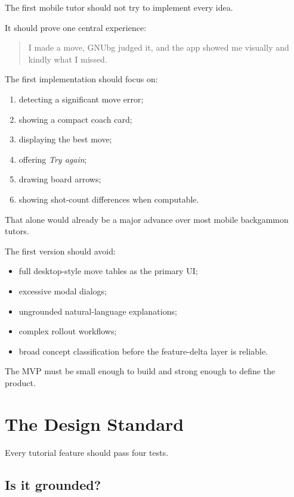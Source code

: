 \documentclass[11pt,a4paper]{article}
\begin{document}
The first mobile tutor should not try to implement every idea.

It should prove one central experience:

\begin{quote}
I made a move, GNUbg judged it, and the app showed me visually and kindly what I missed.
\end{quote}

The first implementation should focus on:

\begin{enumerate}
  \item detecting a significant move error;
  \item showing a compact coach card;
  \item displaying the best move;
  \item offering \textit{Try again};
  \item drawing board arrows;
  \item showing shot-count differences when computable.
\end{enumerate}

That alone would already be a major advance over most mobile backgammon tutors.

The first version should avoid:

\begin{itemize}
  \item full desktop-style move tables as the primary UI;
  \item excessive modal dialogs;
  \item ungrounded natural-language explanations;
  \item complex rollout workflows;
  \item broad concept classification before the feature-delta layer is reliable.
\end{itemize}

The MVP must be small enough to build and strong enough to define the product.

\section{The Design Standard}

Every tutorial feature should pass four tests.

\subsection*{Is it grounded?}
\end{document}
